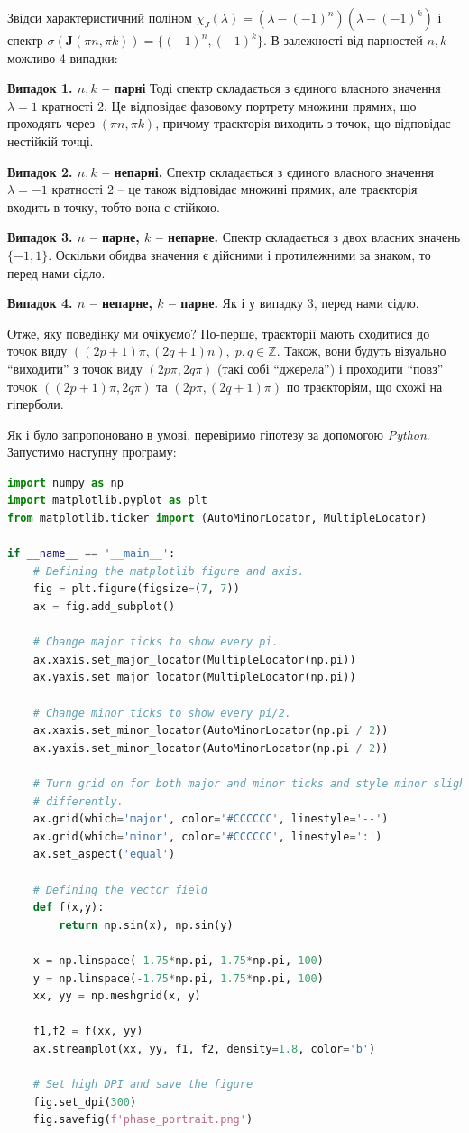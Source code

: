 \documentclass[oneside,solution]{tmpl}
\begin{document}
Звідси характеристичний поліном $\chi_{J}(\lambda) = (\lambda - (-1)^n)(\lambda - (-1)^k)$ і спектр $\sigma(\boldsymbol{J}(\pi n, \pi k)) = \{(-1)^n, (-1)^k\}$. В залежності від парностей $n,k$ можливо 4 випадки:

\textbf{Випадок 1. $n,k$ -- парні} Тоді спектр складається з єдиного власного значення $\lambda=1$ кратності $2$. Це відповідає фазовому портрету множини прямих, що проходять через $(\pi n, \pi k)$, причому траєкторія виходить з точок, що відповідає нестійкій точці.

\textbf{Випадок 2. $n,k$ -- непарні.} Спектр складається з єдиного власного значення $\lambda = -1$ кратності $2$ -- це також відповідає множині прямих, але траєкторія входить в точку, тобто вона є стійкою.

\textbf{Випадок 3. $n$ -- парне, $k$ -- непарне.} Спектр складається з двох власних значень $\{-1,1\}$. Оскільки обидва значення є дійсними і протилежними за знаком, то перед нами сідло.

\textbf{Випадок 4. $n$ -- непарне, $k$ -- парне.} Як і у випадку 3, перед нами сідло.

Отже, яку поведінку ми очікуємо? По-перше, траєкторії мають сходитися до точок виду $((2p+1)\pi,(2q+1)n), \; p,q\in\mathbb{Z}$. Також, вони будуть візуально ``виходити'' з точок виду $(2p\pi, 2q\pi)$ (такі собі ``джерела'') і проходити ``повз'' точок $((2p+1)\pi, 2q\pi)$ та $(2p\pi, (2q+1)\pi)$ по траєкторіям, що схожі на гіперболи. 

Як і було запропоновано в умові, перевіримо гіпотезу за допомогою \textit{Python}. Запустимо наступну програму:
\begin{lstlisting}[language=Python]
import numpy as np
import matplotlib.pyplot as plt
from matplotlib.ticker import (AutoMinorLocator, MultipleLocator)

if __name__ == '__main__':    
    # Defining the matplotlib figure and axis.
    fig = plt.figure(figsize=(7, 7))
    ax = fig.add_subplot()
    
    # Change major ticks to show every pi.
    ax.xaxis.set_major_locator(MultipleLocator(np.pi))
    ax.yaxis.set_major_locator(MultipleLocator(np.pi))
    
    # Change minor ticks to show every pi/2.
    ax.xaxis.set_minor_locator(AutoMinorLocator(np.pi / 2))
    ax.yaxis.set_minor_locator(AutoMinorLocator(np.pi / 2))
    
    # Turn grid on for both major and minor ticks and style minor slightly
    # differently.
    ax.grid(which='major', color='#CCCCCC', linestyle='--')
    ax.grid(which='minor', color='#CCCCCC', linestyle=':')
    ax.set_aspect('equal')

    # Defining the vector field
    def f(x,y):
        return np.sin(x), np.sin(y)
    
    x = np.linspace(-1.75*np.pi, 1.75*np.pi, 100)  
    y = np.linspace(-1.75*np.pi, 1.75*np.pi, 100)  
    xx, yy = np.meshgrid(x, y)

    f1,f2 = f(xx, yy)	
    ax.streamplot(xx, yy, f1, f2, density=1.8, color='b')
    
    # Set high DPI and save the figure
    fig.set_dpi(300)
    fig.savefig(f'phase_portrait.png')
\end{lstlisting}
\end{document}
